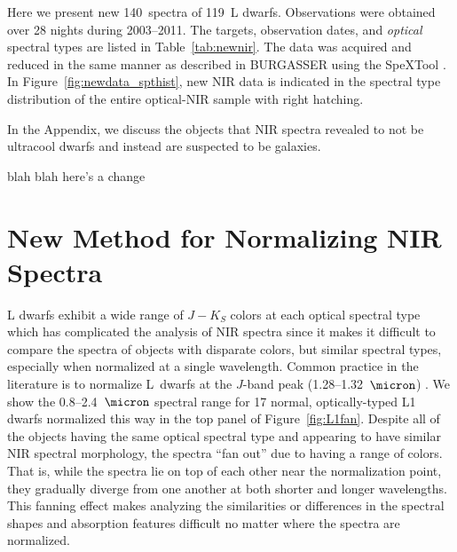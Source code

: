 \documentclass[12pt,preprint]{aastex}
\newcommand{\prismspectra}{140} %
\newcommand{\objects}{119} %
\begin{document}
Here we present new \prismspectra~spectra of \objects~L dwarfs. 
Observations were obtained over 28 nights during 2003--2011. The targets, observation dates, and \emph{optical} spectral types are listed in Table~\ref{tab:newnir}. 
The data was acquired and reduced in the same manner as described in BURGASSER using the SpeXTool \citep{Cushing04,Spextool2}.
In Figure~\ref{fig:newdata_spthist}, new NIR data is indicated in the spectral type distribution of the entire optical-NIR sample with right hatching.

In the Appendix, we discuss the objects that NIR spectra revealed to not be ultracool dwarfs and instead are suspected to be galaxies.

blah blah here's a change


\section{New Method for Normalizing NIR Spectra}
\label{sec:method}

L dwarfs exhibit a wide range of $J-K_S$ colors at each optical spectral type \cite[e.g.,][Fig. 3]{Schmidt10} which has complicated the analysis of NIR spectra since it makes it difficult to  compare the spectra of objects with disparate colors, but similar spectral types, especially when normalized at a single wavelength.
Common practice in the literature is to normalize L~dwarfs at the $J$-band peak (1.28--1.32~$\micron$) \citep[e.g.,][]{Kirkpatrick10}. 
We show the 0.8--2.4~$\micron$ spectral range for 17 normal, optically-typed L1 dwarfs normalized this way in the top panel of Figure~\ref{fig:L1fan}.
Despite all of the objects having the same optical spectral type and appearing to have similar NIR spectral morphology, the spectra ``fan out'' due to having a range of colors. That is, while the spectra lie on top of each other near the normalization point, they gradually diverge from one another at both shorter and longer wavelengths.
This fanning effect makes analyzing the similarities or differences in the spectral shapes and absorption features difficult no matter where the spectra are normalized.
\end{document}

